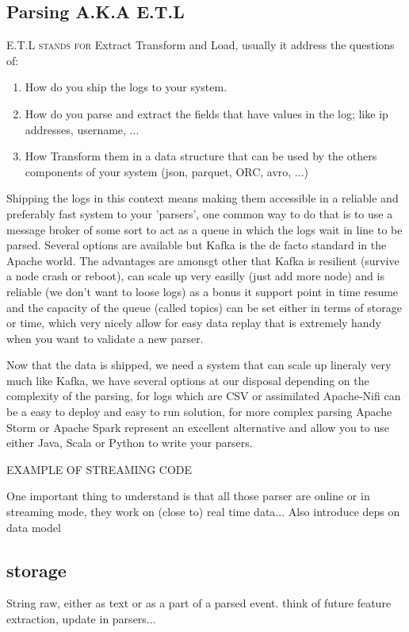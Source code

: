 \documentclass[a4paper,12pt]{article}
\begin{document}
\subsection{Parsing A.K.A E.T.L}
\lettrine{E.T.L}{ stands for} Extract Transform and Load, usually it address the questions of:
\begin{enumerate}
	\item How do you ship the logs to your system.
	\item How do you parse and extract the fields that have values in the log; like ip addresses, username, ...
	\item How Transform them in a data structure that can be used by the others components of your system (json, parquet, ORC, avro, ...)
\end{enumerate}
Shipping the logs in this context means making them accessible in a reliable and preferably fast system to your 'parsers', one common way to do that is to use a 
message broker of some sort to act as a queue in which the logs wait in line to be parsed.
Several options are available but Kafka is the de facto standard in the Apache world.
The advantages are amonsgt other that Kafka is resilient (survive a node crash or reboot), can scale up very easilly (just add more node) and is reliable (we don't want to loose logs) as a bonus 
it support point in time resume and the capacity of the queue (called topics) can be set either in terms of storage or time, which very nicely allow for easy data replay that is extremely handy when you want to validate a new parser.

Now that the data is shipped, we need a system that can scale up lineraly very much like Kafka, we have several options at our disposal depending on the complexity of the parsing, for logs which are CSV or assimilated Apache-Nifi can be a easy to deploy and easy to run solution,
for more complex parsing Apache Storm or Apache Spark represent an excellent alternative and allow you to use either Java, Scala or Python to write your parsers.

EXAMPLE OF STREAMING CODE

One important thing to understand is that all those parser are online or in streaming mode, they work on (close to) real time data...
Also introduce deps on data model
\subsection{storage}
String raw, either as text or as a part of a parsed event. think of future feature extraction, update in parsers...
\newpage
\end{document}
